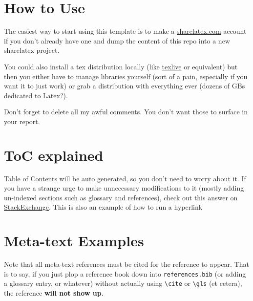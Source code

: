 \documentclass[12pt]{article}
\begin{document}
	\listoffigures
	
	
	\listoftables

	
	
	
	\section{How to Use}
    The easiest way to start using this template is to make a \href{https://www.sharelatex.com}{sharelatex.com} account if you don't already have one and dump the content of this repo into a new sharelatex project.

    You could also install a tex distribution locally (like \href{https://www.tug.org/texlive/}{texlive} or equivalent) but then you either have to manage libraries yourself (sort of a pain, especially if you want it to just work) or grab a distribution with everything ever (dozens of GBs dedicated to Latex?).
    
    Don't forget to delete all my awful comments. You don't want those to surface in your report.

	\section{ToC explained}
	
	Table of Contents will be auto generated, so you don't need to worry about it. If you have a strange urge to make unnecessary modifications to it (mostly adding un-indexed sections such as glossary and references), check out this answer on
    \href{https://tex.stackexchange.com/questions/119719/add-an-item-in-the-table-of-contents}{StackExchange}. This is also an example of how to run a hyperlink
    
	\section{Meta-text Examples}

	Note that all meta-text references must be cited for the reference to appear. That is to say, if you just plop a reference book down into \texttt{references.bib} (or adding a glossary entry, or whatever) without actually using \texttt{\textbackslash cite} or \texttt{\textbackslash gls} (et cetera), the reference \textbf{will not show up}.
    
\end{document}
